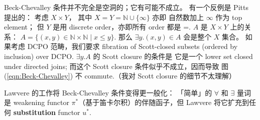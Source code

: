 \begin{preview}
\begin{minipage}{\textwidth}
Beck-Chevalley 条件并不完全是空洞的；它有可能不成立。 有一个反例是 Pitts 提出的： 考虑 $X \times Y$， 其中 $X = Y = \mathbb{N} \cup \{\infty\}$ 亦即 自然数加上 $\infty$ 作为 top element； 但 $Y$ 是用 discrete order，亦即所有 order 都是 =.  $A$ 是 $X \times Y$ 上的关系： $A = \{ (x,y) \in \mathbb{N \times N} \;|\; x \le y \}$.  那么 $\exists y. (x,y) \in A$ 会是整个 $X$ 集合。 如果考虑 DCPO 范畴，我们要求 fibration of Scott-closed subsets (ordered by inclusion) over DCPO.  $\exists y. A$ 的 Scott closure 的条件是 它是一个 lower set closed under directed joins; 而这个 Scott closure 条件似乎不成立，因而导致 图 (\ref{eqn:Beck-Chevalley}) 不 commute.（我对 Scott closure 的细节不太理解）

Lawvere 的工作将 Beck-Chevalley 条件变得更一般化： 「简单」的 $\forall$ 和 $\exists$ 量词 是 weakening functor $\pi^*$（基于笛卡尔积）的伴随函子，但 Lawvere 将它扩充到任何 \textbf{substitution} functor $u^*$.

\end{minipage}
\end{preview}


